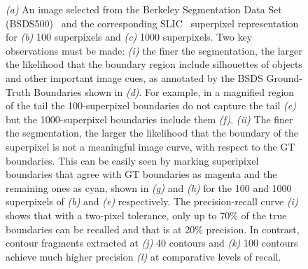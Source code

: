 \begin{figure}[!ht]
\caption{ \emph{(a)} An image selected from the Berkeley Segmentation Data Set (BSDS500)~\cite{Arbelaez:etal:PAMI11} and the corresponding SLIC~\cite{Achanta:etal:PAMI12} superpixel representation for \emph{(b)} 100 superpixels and \emph{(c)} 1000 superpixels. Two key observations must be made: \emph{(i)} the finer the segmentation, the larger the likelihood that the boundary region include silhouettes of objects and other important image cues, as annotated by the BSDS Ground-Truth Boundaries shown in \emph{(d)}. For example, in a magnified region of the tail the 100-superpixel boundaries do not capture the tail \emph{(e)} but the 1000-superpixel  boundaries include them \emph{(f)}.  \emph{(ii)} The finer the segmentation, the larger the likelihood that the boundary of the superpixel is not a meaningful image curve, with respect to the GT boundaries. This can be easily seen by marking superipixel boundaries that agree with GT boundaries as magenta and the remaining ones as cyan, shown in \emph{(g)} and \emph{(h)} for the 100 and 1000 superpixels of \emph{(b)} and \emph{(e)} respectively. The precision-recall curve \emph{(i)} shows that with a two-pixel tolerance, only up to 70\% of the true boundaries can be recalled and that is at 20\% precision. In contrast, contour fragments extracted at \emph{(j)} 40 contours and \emph{(k)} 100 contours achieve much higher precision \emph{(l)} at comparative levels of recall. }
 \label{fig:sp_probs1}
 \end{figure}










